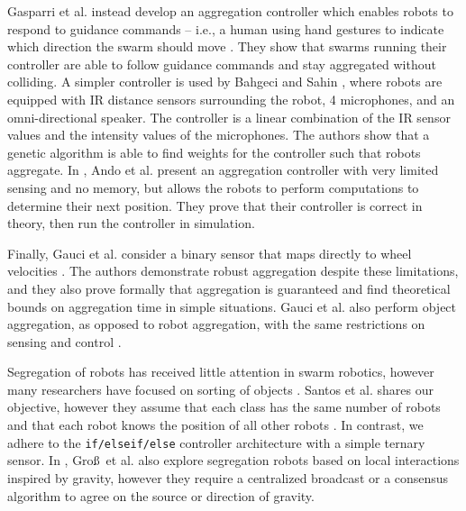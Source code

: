 \documentclass[conference]{IEEEtran}
\begin{document}
   Gasparri et al. instead develop an aggregation controller which enables robots to respond to guidance commands -- i.e., a human using hand gestures to indicate which direction the swarm should move \cite{gasparri_swarm_2012}. They show that swarms running their controller are able to follow guidance commands and stay aggregated without colliding. A simpler controller is used by Bahgeci and Sahin \cite{bahgeci_evolving_2005}, where robots are equipped with IR distance sensors surrounding the robot, 4 microphones, and an omni-directional speaker. The controller is a linear combination of the IR sensor values and the intensity values of the microphones. The authors show that a genetic algorithm is able to find weights for the controller such that robots aggregate. In \cite{ando_distributed_1999}, Ando et al. present an aggregation controller with very limited sensing and no memory, but allows the robots to perform computations to determine their next position. They prove that their controller is correct in theory, then run the controller in simulation.

    Finally, Gauci et al. consider a binary sensor that maps directly to wheel velocities \cite{gauci_self-organized_2014}. The authors demonstrate robust aggregation despite these limitations, and they also prove formally that aggregation is guaranteed and find theoretical bounds on aggregation time in simple situations. Gauci et al. also perform object aggregation, as opposed to robot aggregation, with the same restrictions on sensing and control \cite{gauci_clustering_2014}.

    Segregation of robots has received little attention in swarm robotics, however many researchers have focused on sorting of objects \cite{vardy_accelerated_2012} \cite{holland_collective_1998} \cite{tao_wang_collective_2004} \cite{holland_stigmergy_1999}. Santos et al. shares our objective, however they assume that each class has the same number of robots and that each robot knows the position of all other robots \cite{santos_segregation_2014}. In contrast, we adhere to the \texttt{if/elseif/else} controller architecture with a simple ternary sensor. In \cite{gross_segregation_2009}, Gro\ss\ et al. also explore segregation robots based on local interactions inspired by gravity, however they require a centralized broadcast or a consensus algorithm to agree on the source or direction of gravity.

\end{document}
